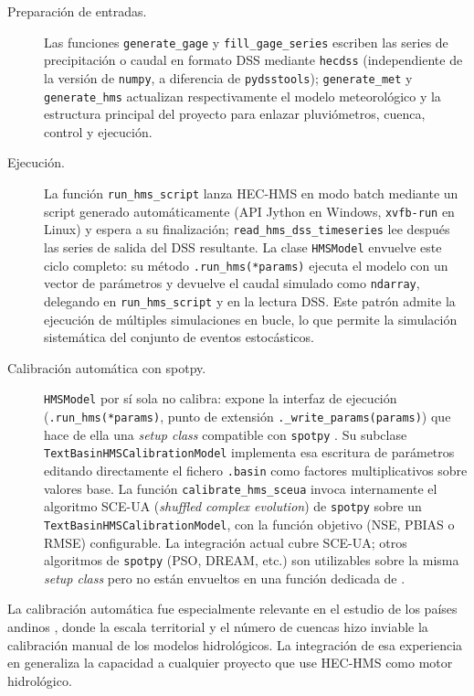 \begin{description}
  \item[Preparación de entradas.] Las funciones \texttt{generate\_gage} y \texttt{fill\_gage\_series} escriben las series de precipitación o caudal en formato DSS mediante \texttt{hecdss} (independiente de la versión de \texttt{numpy}, a diferencia de \texttt{pydsstools}); \texttt{generate\_met} y \texttt{generate\_hms} actualizan respectivamente el modelo meteorológico y la estructura principal del proyecto para enlazar pluviómetros, cuenca, control y ejecución.

  \item[Ejecución.] La función \texttt{run\_hms\_script} lanza HEC-HMS en modo batch mediante un script generado automáticamente (API Jython en Windows, \texttt{xvfb-run} en Linux) y espera a su finalización; \texttt{read\_hms\_dss\_timeseries} lee después las series de salida del DSS resultante. La clase \texttt{HMSModel} envuelve este ciclo completo: su método \texttt{.run\_hms(*params)} ejecuta el modelo con un vector de parámetros y devuelve el caudal simulado como \texttt{ndarray}, delegando en \texttt{run\_hms\_script} y en la lectura DSS. Este patrón admite la ejecución de múltiples simulaciones en bucle, lo que permite la simulación sistemática del conjunto de eventos estocásticos.

  \item[Calibración automática con spotpy.] \texttt{HMSModel} por sí sola no calibra: expone la interfaz de ejecución (\texttt{.run\_hms(*params)}, punto de extensión \texttt{.\_write\_params(params)}) que hace de ella una \emph{setup class} compatible con \texttt{spotpy} \parencite{houska2015spotpy}. Su subclase \texttt{TextBasinHMSCalibrationModel} implementa esa escritura de parámetros editando directamente el fichero \texttt{.basin} como factores multiplicativos sobre valores base. La función \texttt{calibrate\_hms\_sceua} invoca internamente el algoritmo SCE-UA (\emph{shuffled complex evolution}) de \texttt{spotpy} sobre un \texttt{TextBasinHMSCalibrationModel}, con la función objetivo (NSE, PBIAS o RMSE) configurable. La integración actual cubre SCE-UA; otros algoritmos de \texttt{spotpy} (PSO, DREAM, etc.) son utilizables sobre la misma \emph{setup class} pero no están envueltos en una función dedicada de \pyhydra.
\end{description}

La calibración automática fue especialmente relevante en el estudio de los países andinos \parencite{paz2019idb,deljesus2020andinos}, donde la escala territorial y el número de cuencas hizo inviable la calibración manual de los modelos hidrológicos. La integración de esa experiencia en \hydra generaliza la capacidad a cualquier proyecto que use HEC-HMS como motor hidrológico.

